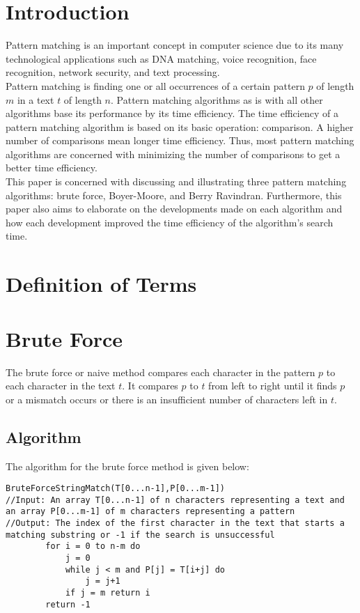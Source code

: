 \section{Introduction}
 Pattern matching is an important concept in computer science due to its many technological applications such as DNA matching, voice recognition, face recognition, network security, and text processing.
\\
Pattern matching is finding one or all occurrences of a certain pattern $p$ of length $m$ in a text $t$ of length $n$. Pattern matching algorithms as is with all other algorithms base its performance by its time efficiency. The time efficiency of a pattern matching algorithm is based on its basic operation: comparison. A higher number of comparisons mean longer time efficiency. Thus, most pattern matching algorithms are concerned with minimizing the number of comparisons to get a better time efficiency.
\\
This paper is concerned with discussing and illustrating three pattern matching algorithms: brute force, Boyer-Moore, and Berry Ravindran. Furthermore, this paper also aims to elaborate on the developments made on each algorithm and how each development improved the time efficiency of the algorithm's search time.
\section{Definition of Terms}

\section{Brute Force}
The brute force or naive method compares each character in the pattern $p$ to each character in the text $t$. It compares $p$ to $t$ from left to right until it finds $p$ or a mismatch occurs or there is an insufficient number of characters left in $t$. 
\subsection{Algorithm}
The algorithm for the brute force method is given below:
\begin{lstlisting}
BruteForceStringMatch(T[0...n-1],P[0...m-1])
//Input: An array T[0...n-1] of n characters representing a text and an array P[0...m-1] of m characters representing a pattern
//Output: The index of the first character in the text that starts a matching substring or -1 if the search is unsuccessful
		for i = 0 to n-m do
			j = 0
			while j < m and P[j] = T[i+j] do
				j = j+1
			if j = m return i
		return -1 
\end{lstlisting} 
